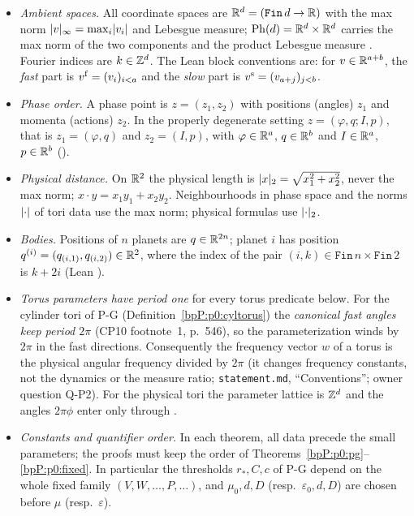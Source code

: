 \begin{itemize}
\item \emph{Ambient spaces.} All coordinate spaces are $\mathbb{R}^d=(\texttt{Fin}\,d\to\mathbb{R})$ with the max norm
  $\lvert v\rvert_\infty=\max_i\lvert v_i\rvert$ and Lebesgue measure; $\mathrm{Ph}(d)=\mathbb{R}^d\times\mathbb{R}^d$ carries the max norm of the two
  components and the product Lebesgue measure . Fourier indices are $k\in\mathbb{Z}^d$. The Lean block
  conventions are: for $v\in\mathbb{R}^{a+b}$, the \emph{fast} part is $v^{\rm f}=(v_i)_{i<a}$ and the \emph{slow} part is
  $v^{\rm s}=(v_{a+j})_{j<b}$.
\item \emph{Phase order.} A phase point is $z=(z_1,z_2)$ with positions (angles) $z_1$ and momenta (actions) $z_2$.
  In the properly degenerate setting $z=(\varphi,q;I,p)$, that is $z_1=(\varphi,q)$ and $z_2=(I,p)$, with
  $\varphi\in\mathbb{R}^a$, $q\in\mathbb{R}^b$ and $I\in\mathbb{R}^a$, $p\in\mathbb{R}^b$ ().
\item \emph{Physical distance.} On $\mathbb{R}^2$ the physical length is $\lvert x\rvert_2=\sqrt{x_1^2+x_2^2}$, never the max norm;
  $x\cdot y=x_1y_1+x_2y_2$. Neighbourhoods in phase space and the norms $\lvert \cdot\rvert$ of tori data use the max
  norm; physical formulas use $\lvert \cdot\rvert_2$.
\item \emph{Bodies.} Positions of $n$ planets are $q\in\mathbb{R}^{2n}$; planet $i$ has position
  $q^{(i)}=(q_{(i,1)},q_{(i,2)})\in\mathbb{R}^2$, where the index of the pair $(i,k)\in\texttt{Fin}\,n\times\texttt{Fin}\,2$ is
  $k+2i$ (Lean ).
\item \emph{Torus parameters have period one} for every torus predicate below. For the cylinder tori of P-G
  (Definition~\ref{bpP:p0:cyltorus}) the \emph{canonical fast angles keep period $2\pi$} (CP10 footnote~1, p.~546), so
  the parameterization winds by $2\pi$ in the fast directions. Consequently the frequency vector $w$ of a torus is the
  physical angular frequency divided by $2\pi$ (it changes frequency constants, not the dynamics or the measure ratio;
  \texttt{statement.md}, ``Conventions''; owner question Q-P2). For the physical tori the parameter lattice is
  $\mathbb{Z}^d$ and the angles $2\pi\phi$ enter only through .
\item \emph{Constants and quantifier order.} In each theorem, all data precede the small parameters; the proofs must
  keep the order of Theorems~\ref{bpP:p0:pg}--\ref{bpP:p0:fixed}. In particular the thresholds $r_*,C,c$ of P-G
  depend on the whole fixed family $(V,W,\dots,P,\dots)$, and $\mu_0,d,D$ (resp.\ $\varepsilon_0,d,D$) are chosen before
  $\mu$ (resp.\ $\varepsilon$).
\end{itemize}

